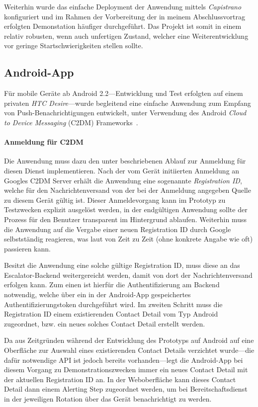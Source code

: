 \documentclass[11pt,utf8,notoc,bibnum,german,final]{zihpub}
\begin{document}
Weiterhin wurde das einfache Deployment der Anwendung mittels
\emph{Capistrano}~\cite{capistrano} konfiguriert und im Rahmen der Vorbereitung
der in meinem Abschlussvortrag erfolgten Demonstation häufiger durchgeführt.
Das Projekt ist somit in einem relativ robusten, wenn auch unfertigen Zustand,
welcher eine Weiterentwicklung vor geringe Startschwierigkeiten stellen sollte.

\subsection{Android-App}

Für mobile Geräte ab Android 2.2—Entwicklung und Test erfolgten auf einem
privaten \emph{HTC Desire}—wurde begleitend eine einfache Anwendung zum Empfang
von Push-Benachrichtigungen entwickelt, unter Verwendung des Android
\emph{Cloud to Device Messaging} (C2DM) Frameworks~\cite{c2dm}.

\paragraph{Anmeldung für C2DM}

Die Anwendung muss dazu den unter \cite[\emph{Lifecycle Flow}]{c2dm}
beschriebenen Ablauf zur Anmeldung für diesen Dienst implementieren. Nach der
vom Gerät initiierten Anmeldung an Googles C2DM Server erhält die Anwendung
eine sogenannte \emph{Registration ID}, welche für den Nachrichtenversand von
der bei der Anmeldung angegeben Quelle zu diesem Gerät gültig ist. Dieser
Anmeldevorgang kann im Prototyp zu Testzwecken explizit ausgelöst werden, in
der endgültigen Anwendung sollte der Prozess für den Benutzer transparent im
Hintergrund ablaufen. Weiterhin muss die Anwendung auf die Vergabe einer neuen
Registration ID durch Google selbstständig reagieren, was laut
\cite[\emph{Handling Registration Results}]{c2dm} von Zeit zu Zeit (ohne
konkrete Angabe wie oft) passieren kann.

Besitzt die Anwendung eine solche gültige Registration ID, muss diese an das
Escalator-Backend weitergereicht werden, damit von dort der Nachrichtenversand
erfolgen kann. Zum einen ist hierfür die Authentifizierung am Backend
notwendig, welche über ein in der Android-App gespeichertes
Authentifizierungstoken durchgeführt wird. Im zweiten Schritt muss die
Registration ID einem existierenden Contact Detail vom Typ Android zugeordnet,
bzw. ein neues solches Contact Detail erstellt werden.

Da aus Zeitgründen während der Entwicklung des Prototyps auf Android auf eine
Oberfläche zur Auswahl eines existierenden Contact Details verzichtet wurde—die
dafür notwendige API ist jedoch bereits vorhanden—legt die Android-App bei
diesem Vorgang zu Demonstrationszwecken immer ein neues Contact Detail mit der
aktuellen Registration ID an. In der Weboberfläche kann dieses Contact Detail
dann einem Alerting Step zugeordnet werden, um bei Bereitschaftsdienst in der
jeweiligen Rotation über das Gerät benachrichtigt zu werden.
\end{document}
